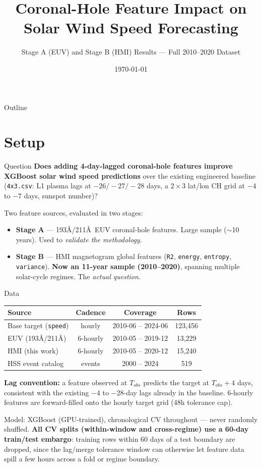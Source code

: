 \documentclass[11pt]{beamer}
\title{Coronal-Hole Feature Impact on\\Solar Wind Speed Forecasting}
\subtitle{Stage A (EUV) and Stage B (HMI) Results --- Full 2010--2020 Dataset}
\author{}
\date{\today}
\begin{document}
\frame{\titlepage}

\begin{frame}{Outline}
\tableofcontents
\end{frame}

\section{Setup}

\begin{frame}{Question}
\textbf{Does adding 4-day-lagged coronal-hole features improve XGBoost solar wind speed predictions} over the existing engineered baseline (\texttt{4x3.csv}: L1 plasma lags at $-26/-27/-28$ days, a $2\times3$ lat/lon CH grid at $-4$ to $-7$ days, sunspot number)?

\vspace{0.5cm}
Two feature sources, evaluated in two stages:

\begin{itemize}
  \item \textbf{Stage A} --- 193\AA/211\AA\ EUV coronal-hole features. Large sample ($\sim$10 years). Used to \emph{validate the methodology}.
  \item \textbf{Stage B} --- HMI magnetogram global features (\texttt{R2}, \texttt{energy}, \texttt{entropy}, \texttt{variance}). \textbf{Now an 11-year sample (2010--2020)}, spanning multiple solar-cycle regimes. The \emph{actual question}.
\end{itemize}
\end{frame}

\begin{frame}{Data}
\begin{table}
\centering
\small
\begin{tabular}{lccc}
\toprule
Source & Cadence & Coverage & Rows \\
\midrule
Base target (\texttt{speed}) & hourly & 2010-06 -- 2024-06 & 123{,}456 \\
EUV (193\AA/211\AA) & 6-hourly & 2010-05 -- 2019-12 & 13{,}229 \\
HMI (this work) & 6-hourly & 2010-05 -- 2020-12 & 15{,}240 \\
HSS event catalog & events & 2000 -- 2024 & 519 \\
\bottomrule
\end{tabular}
\end{table}

\vspace{0.3cm}
\textbf{Lag convention:} a feature observed at $T_{obs}$ predicts the target at $T_{obs} + 4$ days, consistent with the existing $-4$ to $-28$-day lags already in the baseline. 6-hourly features are forward-filled onto the hourly target grid (48h tolerance cap).

\vspace{0.3cm}
Model: XGBoost (GPU-trained), chronological CV throughout --- never randomly shuffled. \textbf{All CV splits (within-window and cross-regime) use a 60-day train/test embargo}: training rows within 60 days of a test boundary are dropped, since the lag/merge tolerance window can otherwise let feature data spill a few hours across a fold or regime boundary.
\end{frame}
\end{document}
